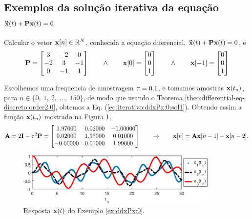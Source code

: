 \subsection{Exemplos da solução iterativa da equação $\DDTVECTOR{x}(t) + \MATRIX{P} \VECTOR{x}(t)=0$}

\begin{example}
\label{ex:iterativo:ddxPx:0}
Calcular o vetor $\VECTOR{x}[n] \in \mathbb{R}^{N}$,
conhecida a equação diferencial, $\DDTVECTOR{x}(t) + \MATRIX{P} \VECTOR{x}(t)=0$, e
\begin{equation}
\MATRIX{P}=
\begin{bmatrix}
3 & -2 & 0\\
-2 & 3 & -1\\
0 & -1 & 1
\end{bmatrix}
\qquad \wedge \qquad
\VECTOR{x}[0]=
\begin{bmatrix}
0\\
0\\
1
\end{bmatrix}
\qquad \wedge \qquad
\VECTOR{x}[-1]=
\begin{bmatrix}
0\\
0\\
1
\end{bmatrix} 
\end{equation}
\end{example}


\begin{SolutionT}
\label{ex:iterativo:ddxPx:0:sol1}
Escolhemos uma frequencia de amostragem $\tau=0.1$, e
tomamos amostras $\VECTOR{x}(t_n)$, para $n \in \{0,~ 1,~ 2,~ ...,~ 150\}$, 
de modo que usando o Teorema \ref{theo:differential-eq-discreto:order2:0}, obtemos a Eq. (\ref{eq:iterativo:ddxPx:0:sol1}).
Obtendo assim a função $\VECTOR{x}(t_n)$ mostrado na Figura \ref{fig:ex:iterativo:ddxPx:0}.
\begin{equation}\label{eq:iterativo:ddxPx:0:sol1}
\MATRIX{A}=
2\MATRIX{I} -\ToS^2 \MATRIX{P}=
\begin{bmatrix}
   1.97000 & 0.02000 &-0.00000\\
   0.02000 & 1.97000 & 0.01000\\
  -0.00000 & 0.01000 & 1.99000
\end{bmatrix}
\qquad \rightarrow \qquad
\VECTOR{x}[n]=\MATRIX{A} \VECTOR{x}[n-1]-\VECTOR{x}[n-2].
\end{equation}
\end{SolutionT}

     \begin{figure}[!h]
         \centering
         \includegraphics[width=0.89\textwidth]{chapters/differential-eq-discreto/mfiles/segundoorder/segundooder1.eps}
         \caption{Resposta $\VECTOR{x}(t)$ do Exemplo \ref{ex:ddxPx:0}.}
         \label{fig:ex:iterativo:ddxPx:0}
     \end{figure}

